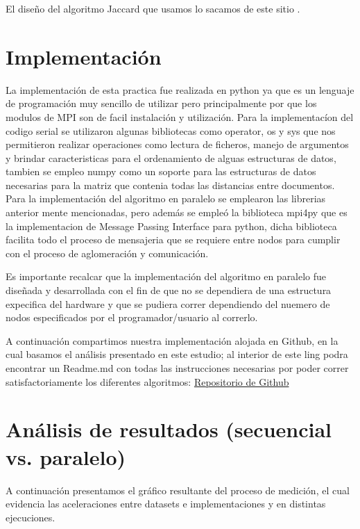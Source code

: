 \documentclass[fleqn,10pt]{SelfArx} %
\begin{document}
El diseño del algoritmo Jaccard que usamos lo sacamos de este sitio \cite{jaccard_seudo}. 

\section{Implementación}
La implementación de esta practica fue realizada en python ya que es un lenguaje de programación muy sencillo de utilizar pero principalmente por que los modulos de MPI son de facil instalación y utilización.
Para la implementacíon del codigo serial se utilizaron algunas bibliotecas como operator, os y sys que nos permitieron realizar operaciones como lectura de ficheros, manejo de argumentos y brindar caracteristicas para el ordenamiento de alguas estructuras de datos, tambien se empleo numpy como un soporte para las estructuras de datos necesarias para la matriz que contenia todas las distancias entre documentos.
Para la implementación del algoritmo en paralelo se emplearon las librerias anterior mente mencionadas, pero además se empleó la biblioteca mpi4py que es la implementacion de Message Passing Interface para python, dicha biblioteca facilita todo el proceso de mensajeria que se requiere entre nodos para cumplir con el proceso de aglomeración y comunicación.

Es importante recalcar que la implementación del algoritmo en paralelo fue diseñada y desarrollada con el fin de que no se dependiera de una estructura expecifica del hardware y que se pudiera correr dependiendo del nuemero de nodos especificados por el programador/usuario al correrlo. 

A continuación compartimos nuestra implementación alojada en Github, en la cual basamos el análisis presentado en este estudio; al interior de este ling podra encontrar un Readme.md con todas las instrucciones necesarias por poder correr satisfactoriamente los diferentes algoritmos: \href{https://github.com/jonyzp/HPC}{Repositorio de Github}

\section{Análisis de resultados (secuencial vs. paralelo)}

A continuación presentamos el gráfico resultante del proceso de medición, el cual evidencia las aceleraciones entre datasets e implementaciones y en distintas ejecuciones.
\end{document}
